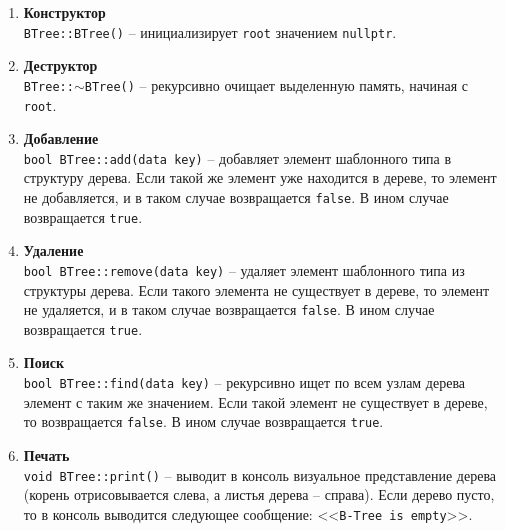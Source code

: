 \begin{enumerate}
    \item \textbf{Конструктор} \\
    \texttt{BTree::BTree()} -- инициализирует \texttt{root} значением \texttt{nullptr}.
    
    \item \textbf{Деструктор} \\
    \texttt{BTree::$\sim$BTree()} -- рекурсивно очищает выделенную память, начиная с \texttt{root}.
    
    \item \textbf{Добавление} \\
    \texttt{bool BTree::add(data key)} -- добавляет элемент шаблонного типа в структуру дерева. Если такой же элемент уже находится в дереве, то элемент не добавляется, и в таком случае возвращается \texttt{false}. В ином случае возвращается \texttt{true}.
    
    \item \textbf{Удаление} \\
    \texttt{bool BTree::remove(data key)} -- удаляет элемент шаблонного типа из структуры дерева. Если такого элемента не существует в дереве, то элемент не удаляется, и в таком случае возвращается \texttt{false}. В ином случае возвращается \texttt{true}.
    
    \item \textbf{Поиск} \\
    \texttt{bool BTree::find(data key)} -- рекурсивно ищет по всем узлам дерева элемент с таким же значением. Если такой элемент не существует в дереве, то возвращается \texttt{false}. В ином случае возвращается \texttt{true}.
    
    \item \textbf{Печать} \\
    \texttt{void BTree::print()} -- выводит в консоль визуальное представление дерева (корень отрисовывается слева, а листья дерева -- справа). Если дерево пусто, то в консоль выводится следующее сообщение: <<\texttt{B-Tree is empty}>>.
\end{enumerate}

\newpage